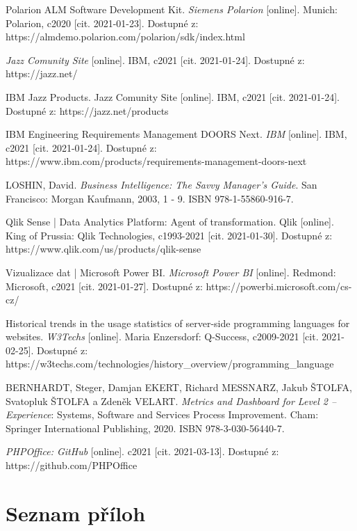 \documentclass[czech,master]{diploma}
\begin{document}
\begin{thebibliography}{43}
Polarion ALM Software Development Kit. \textit{Siemens Polarion} [online]. Munich: Polarion, c2020 [cit. 2021-01-23]. Dostupné z: https://almdemo.polarion.com/polarion/sdk/index.html

\textit{Jazz Comunity Site} [online]. IBM, c2021 [cit. 2021-01-24]. Dostupné z: https://jazz.net/

IBM Jazz Products. Jazz Comunity Site [online]. IBM, c2021 [cit. 2021-01-24]. Dostupné z: https://jazz.net/products

IBM Engineering Requirements Management DOORS Next. \textit{IBM} [online]. IBM, c2021 [cit. 2021-01-24]. Dostupné z: https://www.ibm.com/products/requirements-management-doors-next

LOSHIN, David. \textit{Business Intelligence: The Savvy Manager's Guide}. San Francisco: Morgan Kaufmann, 2003, 1 - 9. ISBN 978-1-55860-916-7.

Qlik Sense | Data Analytics Platform: Agent of transformation. Qlik [online]. King of Prussia: Qlik Technologies, c1993-2021 [cit. 2021-01-30]. Dostupné z: https://www.qlik.com/us/products/qlik-sense

Vizualizace dat | Microsoft Power BI. \textit{Microsoft Power BI} [online]. Redmond: Microsoft, c2021 [cit. 2021-01-27]. Dostupné z: https://powerbi.microsoft.com/cs-cz/

Historical trends in the usage statistics of server-side programming languages for websites. \textit{W3Techs} [online]. Maria Enzersdorf: Q-Success, c2009-2021 [cit. 2021-02-25]. Dostupné z: https://w3techs.com/technologies/history\_overview/programming\_language

BERNHARDT, Steger, Damjan EKERT, Richard MESSNARZ, Jakub ŠTOLFA, Svatopluk ŠTOLFA a Zdeněk VELART. \textit{Metrics and Dashboard for Level 2 – Experience}: Systems, Software and Services Process Improvement. Cham: Springer International Publishing, 2020. ISBN 978-3-030-56440-7.

\textit{PHPOffice: GitHub} [online]. c2021 [cit. 2021-03-13]. Dostupné z: https://github.com/PHPOffice


\end{thebibliography}


\appendix
\chapter{Seznam příloh}
\end{document}
